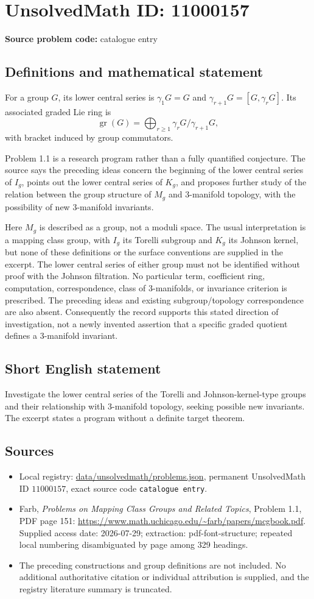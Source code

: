 \documentclass[11pt]{article}
\begin{document}
\section*{UnsolvedMath ID: 11000157}
\textbf{Source problem code:} catalogue entry
\subsection{Definitions and mathematical statement}
For a group $G$, its lower central series is $\gamma_1G=G$ and $\gamma_{r+1}G=[G,\gamma_rG]$. Its associated graded Lie ring is
\[
 \operatorname{gr}(G)=\bigoplus_{r\geq1}\gamma_rG/\gamma_{r+1}G,
\]
with bracket induced by group commutators.

Problem 1.1 is a research program rather than a fully quantified conjecture. The source says the preceding ideas concern the beginning of the lower central series of $I_g$, points out the lower central series of $K_g$, and proposes further study of the relation between the group structure of $M_g$ and $3$-manifold topology, with the possibility of new $3$-manifold invariants.

Here $M_g$ is described as a group, not a moduli space. The usual interpretation is a mapping class group, with $I_g$ its Torelli subgroup and $K_g$ its Johnson kernel, but none of these definitions or the surface conventions are supplied in the excerpt. The lower central series of either group must not be identified without proof with the Johnson filtration. No particular term, coefficient ring, computation, correspondence, class of $3$-manifolds, or invariance criterion is prescribed. The preceding ideas and existing subgroup/topology correspondence are also absent. Consequently the record supports this stated direction of investigation, not a newly invented assertion that a specific graded quotient defines a $3$-manifold invariant.
\subsection{Short English statement}
Investigate the lower central series of the Torelli and Johnson-kernel-type groups and their relationship with $3$-manifold topology, seeking possible new invariants. The excerpt states a program without a definite target theorem.
\subsection{Sources}
\begin{itemize}
\item Local registry: \url{data/unsolvedmath/problems.json}, permanent UnsolvedMath ID $11000157$, exact source code \texttt{catalogue entry}.
\item Farb, \emph{Problems on Mapping Class Groups and Related Topics}, Problem 1.1, PDF page 151: \url{https://www.math.uchicago.edu/~farb/papers/mcgbook.pdf}. Supplied access date: 2026-07-29; extraction: pdf-font-structure; repeated local numbering disambiguated by page among 329 headings.
\item The preceding constructions and group definitions are not included. No additional authoritative citation or individual attribution is supplied, and the registry literature summary is truncated.
\end{itemize}
\end{document}
